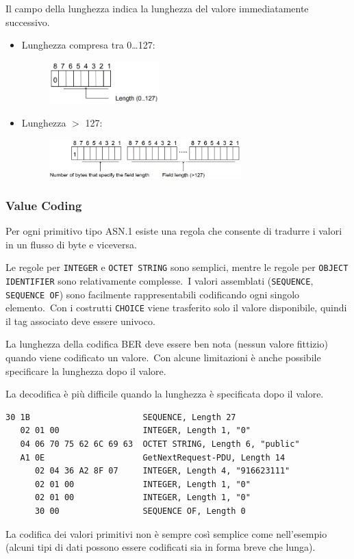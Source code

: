 Il campo della lunghezza indica la lunghezza del valore immediatamente successivo.\
\begin{itemize}
    \item Lunghezza compresa tra 0\dots127:
          \begin{figure}[H]
              \centering
              \includegraphics[width=0.4\textwidth]{immagini/BER_lenght1.png}
          \end{figure}
    \item Lunghezza $>$ 127:
          \begin{figure}[H]
              \centering
              \includegraphics[width=0.7\textwidth]{immagini/BER_lenght2.png}
          \end{figure}
\end{itemize}

\subsubsection{Value Coding}

Per ogni primitivo tipo ASN.1 esiste una regola che consente di tradurre i valori in un flusso di byte e viceversa.\

Le regole per \texttt{INTEGER} e \texttt{OCTET STRING} sono semplici, mentre le regole per \texttt{OBJECT IDENTIFIER} sono relativamente complesse.\
I valori assemblati (\texttt{SEQUENCE}, \texttt{SEQUENCE OF}) sono facilmente rappresentabili codificando ogni singolo elemento.\
Con i costrutti \texttt{CHOICE} viene trasferito solo il valore disponibile, quindi il tag associato deve essere univoco.

La lunghezza della codifica BER deve essere ben nota (nessun valore fittizio) quando viene codificato un valore.\
Con alcune limitazioni è anche possibile specificare la lunghezza dopo il valore.

La decodifica è più difficile quando la lunghezza è specificata dopo il valore.

\begin{verbatim}
30 1B                       SEQUENCE, Length 27
   02 01 00                 INTEGER, Length 1, "0"
   04 06 70 75 62 6C 69 63  OCTET STRING, Length 6, "public"
   A1 0E                    GetNextRequest-PDU, Length 14
      02 04 36 A2 8F 07     INTEGER, Length 4, "916623111"
      02 01 00              INTEGER, Length 1, "0"
      02 01 00              INTEGER, Length 1, "0"
      30 00                 SEQUENCE OF, Length 0
\end{verbatim}

\noindent La codifica dei valori primitivi non è sempre così semplice come nell'esempio (alcuni tipi di dati possono essere codificati sia in forma breve che lunga).
